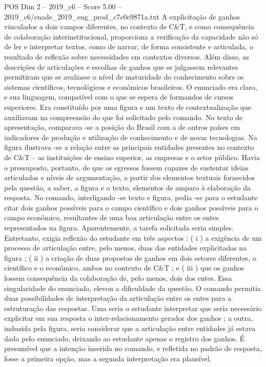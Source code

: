 \begin{textsample}{POS Dim 2 – 2019\_c6 – Score 5.00 – 2019\_c6/enade\_2019\_eng\_prod\_c7c0e9871a.txt}
A explicitação de ganhos vinculados a dois campos diferentes, no contexto de C\&T, e como consequência de colaboração interinstitucional, proporciona a verificação da capacidade não só de ler e interpretar textos, como de narrar, de forma consistente e articulada, o resultado de reflexão sobre necessidades em contextos diversos.
Além disso, as descrições de articulações e escolhas de ganhos que se julgassem relevantes permitiram que se avaliasse o nível de maturidade do conhecimento sobre os sistemas científicos, tecnológicos e econômicos brasileiros.
O enunciado era claro, e sua linguagem, compatível com o que se espera de formandos de cursos superiores.
Era constituído por uma figura e um texto de contextualização que auxiliavam na compreensão do que foi solicitado pelo comando.
No texto de apresentação, comparava -se a posição do Brasil com a de outros países em indicadores de produção e utilização de conhecimento e de novas tecnologias.
Na figura ilustrava -se a relação entre as principais entidades presentes no contexto de C\&T – as instituições de ensino superior, as empresas e o setor público.
Havia o pressuposto, portanto, de que os egressos fossem capazes de sustentar ideias articuladas e níveis de argumentação, a partir dos elementos textuais fornecidos pela questão, a saber, a figura e o texto, elementos de amparo à elaboração da resposta.
No comando, interligando -se texto e figura, pedia -se para o estudante citar dois ganhos possíveis para o campo científico e dois ganhos possíveis para o campo econômico, resultantes de uma boa articulação entre os entes representados na figura.
Aparentemente, a tarefa solicitada seria simples.
Entretanto, exigia reflexão do estudante em três aspectos : ( i ) a exigência de um processo de articulação entre, pelo menos, duas das entidades explicitadas na figura ; ( ii ) a criação de duas propostas de ganhos em dois setores diferentes, o científico e o econômico, ambos no contexto de C\&T ; e ( iii ) que os ganhos fossem consequência da colaboração de, pelo menos, dois dos entes.
Essa singularidade do enunciado, elevou a dificuldade da questão.
O comando permitia duas possibilidades de interpretação da articulação entre os entes para a estruturação das respostas.
Uma seria o estudante interpretar que seria necessário explicitar em sua resposta o inter-relacionamento gerador dos ganhos ; a outra, induzida pela figura, seria considerar que a articulação entre entidades já estava dada pelo enunciado, deixando ao estudante apenas o registro dos ganhos.
É presumível que a intenção inserida no comando, e refletida no padrão de resposta, fosse a primeira opção, mas a segunda interpretação era plausível.

\end{textsample}
